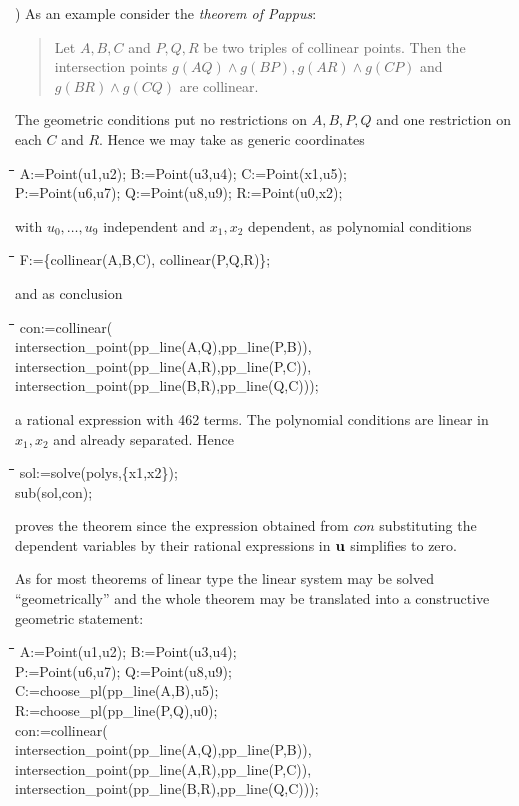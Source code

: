 \documentclass{article}
\newenvironment{code}{\tt \begin{tabbing}
\hspace*{1cm}\=\hspace*{1cm}\=\hspace*{1cm}\=
\hspace*{1cm}\=\hspace*{1cm}\=\kill
}{\end{tabbing}}
\newcommand{\uhh}{{\bf u}}
\begin{document}
) As an example consider the {\em theorem of Pappus}:
\begin{quote}
Let $A,B,C$ and $P,Q,R$ be two triples of collinear points. Then the
intersection points $g(AQ)\wedge g(BP), g(AR)\wedge g(CP)$ and
$g(BR)\wedge g(CQ)$ are collinear.
\end{quote}
The geometric conditions put no restrictions on $A,B,P,Q$ and one
restriction on each $C$ and $R$. Hence we may take as generic
coordinates
\begin{code}\>\+
A:=Point(u1,u2); B:=Point(u3,u4); C:=Point(x1,u5);\\
P:=Point(u6,u7); Q:=Point(u8,u9); R:=Point(u0,x2);
\end{code}
with $u_0,\ldots,u_9$ independent and $x_1,x_2$ dependent, as
polynomial conditions
\begin{code}\>
F:=\{collinear(A,B,C), collinear(P,Q,R)\};
\end{code}
and as conclusion
\begin{code}\+\+
con:=collinear(\\
	intersection\_point(pp\_line(A,Q),pp\_line(P,B)),\\
	intersection\_point(pp\_line(A,R),pp\_line(P,C)),\\
	intersection\_point(pp\_line(B,R),pp\_line(Q,C)));
\end{code}
a rational expression with 462 terms. The polynomial conditions are
linear in $x_1,x_2$ and already separated. Hence
\begin{code}\>\+
sol:=solve(polys,\{x1,x2\});\\
sub(sol,con);
\end{code}
proves the theorem since the expression obtained from $con$
substituting the dependent variables by their rational expressions in
$\uhh$ simplifies to zero.
\medskip

As for most theorems of linear type the linear system may be solved
``geometrically'' and the whole theorem may be translated into a
constructive geometric statement:
\begin{code}\>\+
A:=Point(u1,u2); B:=Point(u3,u4);\\ 
P:=Point(u6,u7); Q:=Point(u8,u9);\\[6pt] 

C:=choose\_pl(pp\_line(A,B),u5);\\
R:=choose\_pl(pp\_line(P,Q),u0);\\[6pt]

con:=collinear(\+\\
	intersection\_point(pp\_line(A,Q),pp\_line(P,B)),\\
	intersection\_point(pp\_line(A,R),pp\_line(P,C)),\\
	intersection\_point(pp\_line(B,R),pp\_line(Q,C)));
\end{code}
\end{document}
